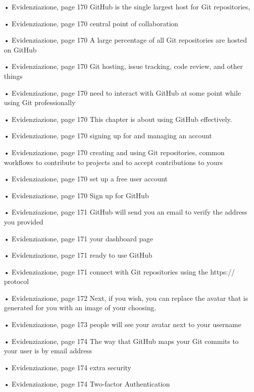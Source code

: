 
• Evidenziazione, page 170
GitHub is the single largest host for Git repositories,

• Evidenziazione, page 170
central point of collaboration

• Evidenziazione, page 170
A large percentage of all Git repositories are hosted on GitHub

• Evidenziazione, page 170
Git hosting, issue tracking, code review, and other things

• Evidenziazione, page 170
need to interact with GitHub at some point while using Git professionally

• Evidenziazione, page 170
This chapter is about using GitHub effectively.

• Evidenziazione, page 170
signing up for and managing an account

• Evidenziazione, page 170
creating and using Git repositories, common workflows to contribute to projects and to accept contributions to yours

• Evidenziazione, page 170
set up a free user account

• Evidenziazione, page 170
Sign up for GitHub

• Evidenziazione, page 171
GitHub will send you an email to verify the address you provided

• Evidenziazione, page 171
your dashboard page

• Evidenziazione, page 171
ready to use GitHub

• Evidenziazione, page 171
connect with Git repositories using the https:// protocol

• Evidenziazione, page 172
Next, if you wish, you can replace the avatar that is generated for you with an image of your choosing.

• Evidenziazione, page 173
people will see your avatar next to your username

• Evidenziazione, page 174
The way that GitHub maps your Git commits to your user is by email address

• Evidenziazione, page 174
extra security

• Evidenziazione, page 174
Two-factor Authentication

